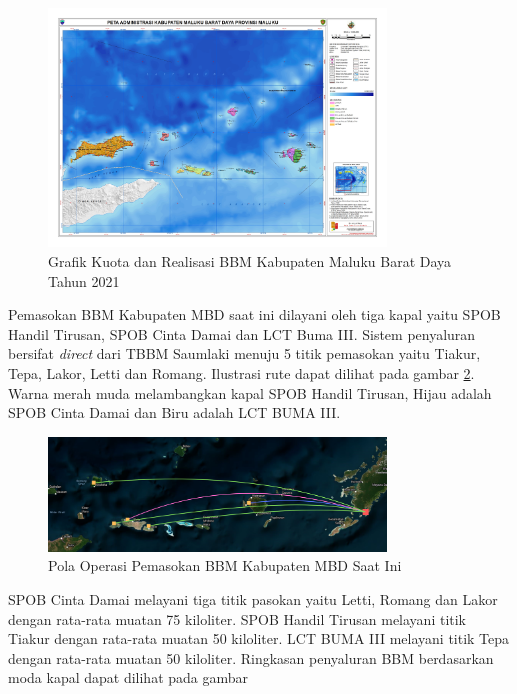 \begin{figure}[htbp!]
    \centering
    \includegraphics[width=0.8\textwidth]{gambar/administrasi-maluku-barat-daya-a1.jpg}
    \caption{Grafik Kuota dan Realisasi BBM Kabupaten Maluku Barat Daya Tahun 2021 \citep{Pertamina_2021}}
    \label{fig:realisasi-bbm-mbd}
\end{figure}

    Pemasokan BBM Kabupaten MBD saat ini dilayani oleh tiga kapal yaitu SPOB Handil Tirusan, SPOB Cinta Damai dan LCT Buma III.
    Sistem penyaluran bersifat \emph{direct} dari TBBM Saumlaki menuju 5 titik pemasokan yaitu Tiakur, Tepa, Lakor, Letti dan Romang. Ilustrasi rute dapat dilihat pada gambar \ref{fig:rute-old-bbm-mbd}. Warna merah muda melambangkan kapal SPOB Handil Tirusan, Hijau adalah SPOB Cinta Damai dan Biru adalah LCT BUMA III.

\begin{figure}[htbp!]
    \centering
    \includegraphics[width=0.8\textwidth]{gambar/rute-eksisting.png}
    \caption{Pola Operasi Pemasokan BBM Kabupaten MBD Saat Ini}
    \label{fig:rute-old-bbm-mbd}
\end{figure}

    SPOB Cinta Damai melayani tiga titik pasokan yaitu Letti, Romang dan Lakor dengan rata-rata muatan 75 kiloliter. SPOB Handil Tirusan melayani titik Tiakur dengan rata-rata muatan 50 kiloliter. LCT BUMA III melayani titik Tepa dengan rata-rata muatan 50 kiloliter. Ringkasan penyaluran BBM berdasarkan moda kapal dapat dilihat pada gambar 

